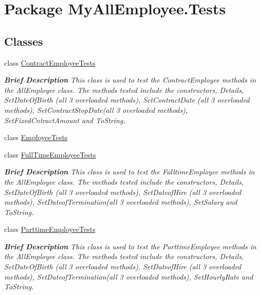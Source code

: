 \hypertarget{namespace_my_all_employee_1_1_tests}{}\section{Package My\+All\+Employee.\+Tests}
\label{namespace_my_all_employee_1_1_tests}
\subsection*{Classes}
\begin{DoxyCompactItemize}
\item 
class \hyperlink{class_my_all_employee_1_1_tests_1_1_contract_employee_tests}{Contract\+Employee\+Tests}
\begin{DoxyCompactList}\small\item\em {\bfseries  Brief Description} This class is used to test the Contract\+Employee methods in the All\+Employee class. The methods tested include the constructors, Details, Set\+Date\+Of\+Birth (all 3 overloaded methods), Set\+Contract\+Date (all 3 overloaded methods), Set\+Contract\+Stop\+Date(all 3 overloaded methods), Set\+Fixed\+Cntract\+Amount and To\+String. \end{DoxyCompactList}\item 
class \hyperlink{class_my_all_employee_1_1_tests_1_1_employee_tests}{Employee\+Tests}
\item 
class \hyperlink{class_my_all_employee_1_1_tests_1_1_full_time_employee_tests}{Full\+Time\+Employee\+Tests}
\begin{DoxyCompactList}\small\item\em {\bfseries  Brief Description} This class is used to test the Fulltime\+Employee methods in the All\+Employee class. The methods tested include the constructors, Details, Set\+Date\+Of\+Birth (all 3 overloaded methods), Set\+Dateof\+Hire (all 3 overloaded methods), Set\+Dateof\+Termination(all 3 overloaded methods), Set\+Salary and To\+String. \end{DoxyCompactList}\item 
class \hyperlink{class_my_all_employee_1_1_tests_1_1_parttime_employee_tests}{Parttime\+Employee\+Tests}
\begin{DoxyCompactList}\small\item\em {\bfseries  Brief Description} This class is used to test the Parttime\+Employee methods in the All\+Employee class. The methods tested include the constructors, Details, Set\+Date\+Of\+Birth (all 3 overloaded methods), Set\+Dateof\+Hire (all 3 overloaded methods), Set\+Dateof\+Termination(all 3 overloaded methods), Set\+Hourly\+Rate and To\+String. \end{DoxyCompactList}\item 

\end{DoxyCompactItemize}
